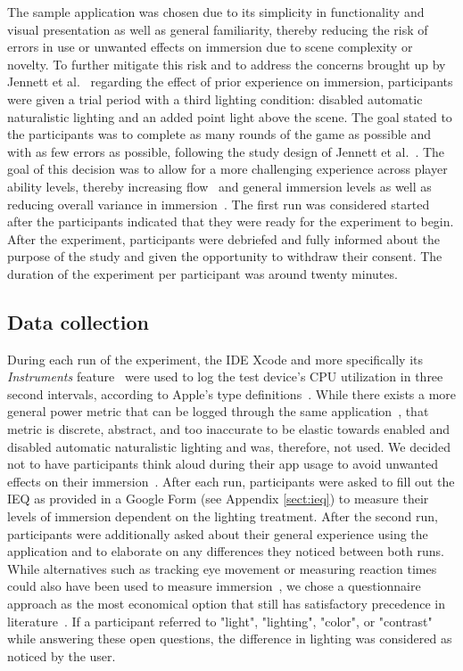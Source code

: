 \documentclass[12pt,twoside,english]{article}
\begin{document}
The sample application was chosen due to its simplicity in functionality and visual presentation as well as general familiarity, thereby reducing the risk of errors in use or unwanted effects on immersion due to scene complexity or novelty.
To further mitigate this risk and to address the concerns brought up by Jennett et al.~\cite{jennett_measuring_2008} regarding the effect of prior experience on immersion, participants were given a trial period with a third lighting condition: disabled automatic naturalistic lighting and an added point light above the scene.
The goal stated to the participants was to complete as many rounds of the game as possible and with as few errors as possible, following the study design of Jennett et al.~\cite{jennett_measuring_2008}.
The goal of this decision was to allow for a more challenging experience across player ability levels, thereby increasing flow~\cite{csikszentmihalyi_flow_1990} and general immersion levels as well as reducing overall variance in immersion~\cite{jennett_measuring_2008}.
The first run was considered started after the participants indicated that they were ready for the experiment to begin.
After the experiment, participants were debriefed and fully informed about the purpose of the study and given the opportunity to withdraw their consent.
The duration of the experiment per participant was around twenty minutes.

\subsection{Data collection}
\label{sect:data_collection}

During each run of the experiment, the \gls{IDE} Xcode and more specifically its \textit{Instruments} feature~\cite{apple_xcode_2020} were used to log the test device's \gls{CPU} utilization in three second intervals, according to Apple's type definitions~\cite{apple_system_2020}.
While there exists a more general power metric that can be logged through the same application~\cite{apple_energy_2020-1}, that metric is discrete, abstract, and too inaccurate to be elastic towards enabled and disabled automatic naturalistic lighting and was, therefore, not used.
We decided not to have participants think aloud during their app usage to avoid unwanted effects on their immersion~\cite{van_den_haak_retrospective_2003}.
After each run, participants were asked to fill out the \gls{IEQ} as provided in a Google Form (see Appendix \ref{sect:ieq}) to measure their levels of immersion dependent on the lighting treatment.
After the second run, participants were additionally asked about their general experience using the application and to elaborate on any differences they noticed between both runs.
While alternatives such as tracking eye movement or measuring reaction times could also have been used to measure immersion~\cite{jennett_measuring_2008}, we chose a questionnaire approach as the most economical option that still has satisfactory precedence in literature~\cite{boyle_engagement_2012}.
If a participant referred to "light", "lighting", "color", or "contrast" while answering these open questions, the difference in lighting was considered as noticed by the user.
\end{document}
